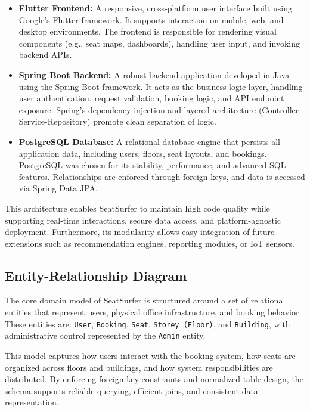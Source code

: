 \documentclass[12pt,a4paper]{report} %
\begin{document}
\begin{itemize}
    \item \textbf{Flutter Frontend:} A responsive, cross-platform user interface built using Google's Flutter framework. It supports interaction on mobile, web, and desktop environments. The frontend is responsible for rendering visual components (e.g., seat maps, dashboards), handling user input, and invoking backend APIs.

    \item \textbf{Spring Boot Backend:} A robust backend application developed in Java using the Spring Boot framework. It acts as the business logic layer, handling user authentication, request validation, booking logic, and API endpoint exposure. Spring's dependency injection and layered architecture (Controller-Service-Repository) promote clean separation of logic.

    \item \textbf{PostgreSQL Database:} A relational database engine that persists all application data, including users, floors, seat layouts, and bookings. PostgreSQL was chosen for its stability, performance, and advanced SQL features. Relationships are enforced through foreign keys, and data is accessed via Spring Data JPA.
\end{itemize}

\noindent
This architecture enables SeatSurfer to maintain high code quality while supporting real-time interactions, secure data access, and platform-agnostic deployment. Furthermore, its modularity allows easy integration of future extensions such as recommendation engines, reporting modules, or IoT sensors.

\subsection{Entity-Relationship Diagram}

The core domain model of SeatSurfer is structured around a set of relational entities that represent users, physical office infrastructure, and booking behavior. These entities are: \texttt{User}, \texttt{Booking}, \texttt{Seat}, \texttt{Storey (Floor)}, and \texttt{Building}, with administrative control represented by the \texttt{Admin} entity.

This model captures how users interact with the booking system, how seats are organized across floors and buildings, and how system responsibilities are distributed. By enforcing foreign key constraints and normalized table design, the schema supports reliable querying, efficient joins, and consistent data representation.
\end{document}
